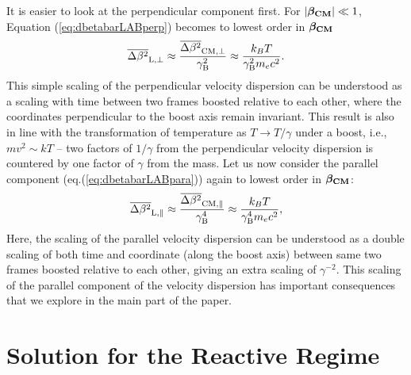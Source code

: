 \documentclass[usenatbib,iop,apj]{emulateapj}
\newcommand\bmath[1] {\mbox{\boldmath$\rm #1$}}
\newcommand{\betaCM}{\ensuremath{\bmath{\beta_{\rm CM}}}}
\newcommand{\dbetabarLABpara}{\ensuremath{\overline{\Delta\beta^2}_{\rm L, \parallel}}}
\newcommand{\dbetabarLABperp}{\ensuremath{\overline{\Delta\beta^2}_{\rm L, \perp}}}
\newcommand{\dbetabarCMpara}{\ensuremath{\overline{\Delta\beta^2}_{\rm CM, \parallel}}}
\newcommand{\dbetabarCMperp}{\ensuremath{\overline{\Delta\beta^2}_{\rm CM, \perp}}}
\begin{document}
It is easier to look at the perpendicular component first.  For $\left|\betaCM\right| \ll 1$, Equation (\ref{eq:dbetabarLABperp}) becomes to lowest order in $\betaCM$ 
\begin{equation}
 \dbetabarLABperp \approx \frac{\dbetabarCMperp}{\gamma_{\rm B}^2} \approx \frac {k_B T}{\gamma_{\rm B}^2 m_e c^2 }.
\end{equation}
This simple scaling of the perpendicular velocity dispersion can be understood as a scaling with time between two frames boosted relative to each other, where the coordinates perpendicular to the boost axis remain invariant.  This result is also in line with the transformation of temperature as $T\rightarrow T/\gamma$ under a boost, i.e., $mv^2 \sim kT$ -- two factors of $1/\gamma$ from the perpendicular velocity dispersion is countered by one factor of $\gamma$ from the mass.  Let us now consider the parallel component (eq.(\ref{eq:dbetabarLABpara})) again to lowest order in $\betaCM$: 
\begin{equation}
 \dbetabarLABpara \approx \frac{\dbetabarCMpara}{\gamma_{\rm B}^{4}}  \approx \frac {k_B T}{\gamma_{\rm B}^4 m_e c^2 },
\end{equation}
Here, the scaling of the parallel velocity dispersion can be understood as a double scaling of both time and coordinate (along the boost axis) between same two frames boosted relative to each other, giving an extra scaling of $\gamma^{-2}$.
This scaling of the parallel component of the velocity dispersion has important consequences that we explore in the main part of the paper.  



\section{Solution for the Reactive Regime}\label{sec:solution reactive}
\end{document}
